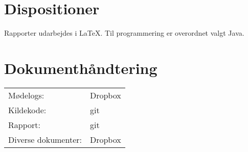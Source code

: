 \section*{Dispositioner}
Rapporter udarbejdes i \LaTeX. Til programmering er overordnet valgt Java.

\section*{Dokumenthåndtering}
\begin{center}
\begin{tabular}{l l}
	Mødelogs:			& Dropbox \\
	Kildekode:			& git \\
	Rapport:			& git \\
	Diverse dokumenter:	& Dropbox
\end{tabular}
\end{center}
